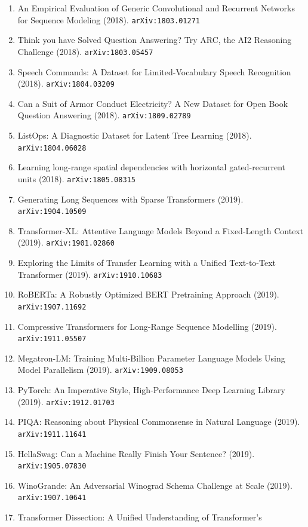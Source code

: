 \documentclass[11pt]{article}
\begin{document}
\begin{enumerate}
  Understanding (2018). \texttt{arXiv:1804.07461}
  \item An Empirical Evaluation of Generic Convolutional and Recurrent Networks
  for Sequence Modeling (2018). \texttt{arXiv:1803.01271}
  \item Think you have Solved Question Answering? Try ARC, the AI2 Reasoning
  Challenge (2018). \texttt{arXiv:1803.05457}
  \item Speech Commands: A Dataset for Limited-Vocabulary Speech Recognition (2018). \texttt{arXiv:1804.03209}
  \item Can a Suit of Armor Conduct Electricity? A New Dataset for Open Book
  Question Answering (2018). \texttt{arXiv:1809.02789}
  \item ListOps: A Diagnostic Dataset for Latent Tree Learning (2018). \texttt{arXiv:1804.06028}
  \item Learning long-range spatial dependencies with horizontal gated-recurrent
  units (2018). \texttt{arXiv:1805.08315}
  \item Generating Long Sequences with Sparse Transformers (2019). \texttt{arXiv:1904.10509}
  \item Transformer-XL: Attentive Language Models Beyond a Fixed-Length Context (2019). \texttt{arXiv:1901.02860}
  \item Exploring the Limits of Transfer Learning with a Unified Text-to-Text
  Transformer (2019). \texttt{arXiv:1910.10683}
  \item RoBERTa: A Robustly Optimized BERT Pretraining Approach (2019). \texttt{arXiv:1907.11692}
  \item Compressive Transformers for Long-Range Sequence Modelling (2019). \texttt{arXiv:1911.05507}
  \item Megatron-LM: Training Multi-Billion Parameter Language Models Using
  Model Parallelism (2019). \texttt{arXiv:1909.08053}
  \item PyTorch: An Imperative Style, High-Performance Deep Learning Library (2019). \texttt{arXiv:1912.01703}
  \item PIQA: Reasoning about Physical Commonsense in Natural Language (2019). \texttt{arXiv:1911.11641}
  \item HellaSwag: Can a Machine Really Finish Your Sentence? (2019). \texttt{arXiv:1905.07830}
  \item WinoGrande: An Adversarial Winograd Schema Challenge at Scale (2019). \texttt{arXiv:1907.10641}
  \item Transformer Dissection: A Unified Understanding of Transformer's

\end{enumerate}
\end{document}

